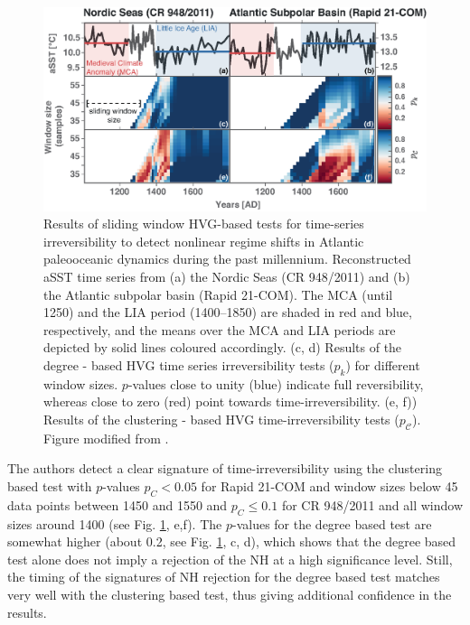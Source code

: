		\begin{figure}
		\noindent\includegraphics[width=\columnwidth]{Chapter06_Applications/schleussner_lia_vg_analysis.eps}
		\caption{Results of sliding window HVG-based tests for time-series irreversibility to detect nonlinear regime shifts in Atlantic paleooceanic dynamics during the past millennium. Reconstructed aSST time series from (a) the Nordic Seas (CR 948/2011) and (b) the Atlantic subpolar basin (Rapid 21-COM). The MCA (until 1250) and the LIA period (1400--1850) are shaded in red and blue, respectively, and the means over the MCA and LIA periods are depicted by solid lines coloured accordingly. (c, d) Results of the degree - based HVG time series irreversibility tests ($p_k$) for different window sizes. $p$-values close to unity (blue) indicate full reversibility, whereas close to zero (red) point towards time-irreversibility. (e, f)) Results of the clustering - based HVG time-irreversibility tests ($p_\mathcal{C}$). Figure modified from \cite{schleussner2015indications}.}
		\label{fig:lia_vg_analysis}
		\end{figure}

		The authors detect a clear signature of time-irreversibility using the clustering based test with $p$-values $p_C < 0.05$ for Rapid 21-COM and window sizes below 45 data points between 1450 and 1550 and $p_C \leq 0.1$ for CR 948/2011 and all window sizes around 1400 (see Fig. \ref{fig:lia_vg_analysis}, e,f). The $p$-values for the degree based test are somewhat higher (about 0.2, see Fig. \ref{fig:lia_vg_analysis}, c, d), which shows that the degree based test alone does not imply a rejection of the NH at a high significance level. Still, the timing of the signatures of NH rejection for the degree based test matches very well with the clustering based test, thus giving additional confidence in the results.


